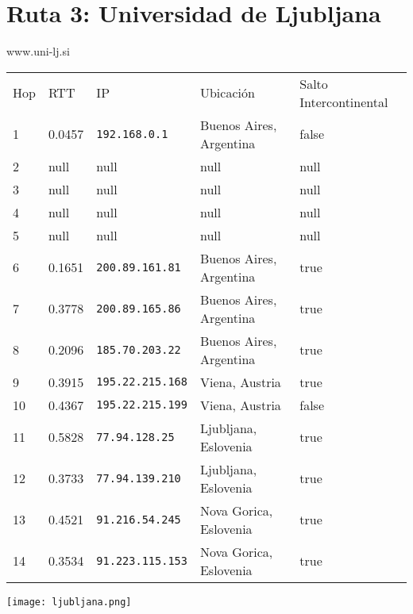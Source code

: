 \section{Ruta 3: Universidad de Ljubljana}

www.uni-lj.si

\begin{tabular}{l | l | l | l | l}
Hop & RTT & IP & Ubicación & Salto Intercontinental\\
1 & 0.0457 & \texttt{192.168.0.1} & Buenos Aires, Argentina & false\\
2 & null & null & null & null\\
3 & null & null & null & null\\
4 & null & null & null & null\\
5 & null & null & null & null\\
6 & 0.1651 & \texttt{200.89.161.81} & Buenos Aires, Argentina & true\\
7 & 0.3778 & \texttt{200.89.165.86} & Buenos Aires, Argentina & true\\
8 & 0.2096 & \texttt{185.70.203.22} & Buenos Aires, Argentina & true\\
9 & 0.3915 & \texttt{195.22.215.168} & Viena, Austria & true\\
10 & 0.4367 & \texttt{195.22.215.199} & Viena, Austria & false\\
11 & 0.5828 & \texttt{77.94.128.25} & Ljubljana, Eslovenia & true\\
12 & 0.3733 & \texttt{77.94.139.210} & Ljubljana, Eslovenia & true\\
13 & 0.4521 & \texttt{91.216.54.245} & Nova Gorica, Eslovenia & true\\
14 & 0.3534 & \texttt{91.223.115.153} & Nova Gorica, Eslovenia & true\\
\end{tabular}

\texttt{[image: ljubljana.png]}